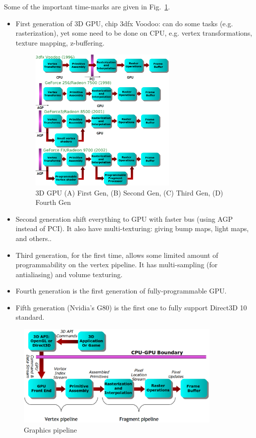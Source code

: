 Some of the important time-marks are given in
Fig.~\ref{fig:gen_of_GPU}.
\begin{itemize}
\item First generation of 3D GPU, chip 3dfx Voodoo: can do some tasks
  (e.g. rasterization), yet some need to be done on CPU, e.g. vertex
  transformations, texture mapping, z-buffering.
\begin{figure}[hbt]
  \centerline{\includegraphics[height=7cm,
    angle=0]{./images/graphics_pipeline_2.eps}}
\caption{3D GPU (A) First Gen, (B) Second Gen, (C) Third Gen, (D) Fourth Gen}
\label{fig:gen_of_GPU}
\end{figure}

\item Second generation shift everything to GPU with faster bus (using
  AGP instead of PCI). It also have multi-texturing: giving bump maps,
  light maps, and others..

\item Third generation, for the first time, allows some limited amount
  of programmability on the vertex pipeline. It has multi-sampling
  (for antialiasing) and volume texturing. 

\item Fourth generation is the first generation of fully-programmable
  GPU. 
\item Fifth generation (Nvidia's G80) is the first one to fully
  support Direct3D 10 standard.
\end{itemize}


\begin{figure}[hbt]
  \centerline{\includegraphics[height=5cm, angle=0]{./images/graphics_pipeline_3.eps}}
  \caption{Graphics pipeline}
  \label{fig:graph_pipeline_2}
\end{figure}

